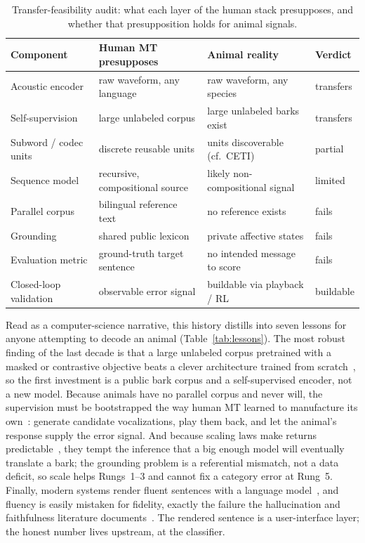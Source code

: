 \begin{table}[htbp]
\centering
\caption{Transfer-feasibility audit: what each layer of the human stack
presupposes, and whether that presupposition holds for animal signals.}
\label{tab:transfer}
\footnotesize
\setlength{\tabcolsep}{4pt}
\begin{tabular}{@{}p{2.8cm}p{4.4cm}p{4.4cm}p{2.0cm}@{}}
\toprule
\textbf{Component} & \textbf{Human MT presupposes} & \textbf{Animal reality} & \textbf{Verdict} \\
\midrule
Acoustic encoder & raw waveform, any language & raw waveform, any species & transfers \\
Self-supervision & large unlabeled corpus & large unlabeled barks exist & transfers \\
Subword / codec units & discrete reusable units & units discoverable (cf.\ CETI) & partial \\
Sequence model & recursive, compositional source & likely non-compositional signal & limited \\
Parallel corpus & bilingual reference text & no reference exists & fails \\
Grounding & shared public lexicon & private affective states & fails \\
Evaluation metric & ground-truth target sentence & no intended message to score & fails \\
Closed-loop validation & observable error signal & buildable via playback / RL & buildable \\
\bottomrule
\end{tabular}
\end{table}

Read as a computer-science narrative, this history distills into seven
lessons for anyone attempting to decode an animal
(Table~\ref{tab:lessons}). The most robust finding of the last decade is
that a large unlabeled corpus pretrained with a masked or contrastive
objective beats a clever architecture trained from
scratch~\cite{devlin2019bert,baevski2020wav2vec2,liu2019roberta}, so the
first investment is a public bark corpus and a self-supervised encoder, not
a new model. Because animals have no parallel corpus and never will, the
supervision must be bootstrapped the way human MT learned to manufacture
its own~\cite{sennrich2016improving,edunov2018backtrans,artetxe2018unsupervised,lample2018unsupervised}:
generate candidate vocalizations, play them back, and let the animal's
response supply the error signal. And because scaling laws make returns
predictable~\cite{kaplan2020scaling,hoffmann2022chinchilla}, they tempt the
inference that a big enough model will eventually translate a bark; the
grounding problem is a referential mismatch, not a data deficit, so scale
helps Rungs~1--3 and cannot fix a category error at Rung~5. Finally, modern
systems render fluent sentences with a language
model~\cite{brown2020gpt3,ouyang2022instruct}, and fluency is easily mistaken
for fidelity, exactly the failure the hallucination and faithfulness
literature documents~\cite{ji2023hallucination,maynez2020faithfulness}. The
rendered sentence is a user-interface layer; the honest number lives
upstream, at the classifier.

